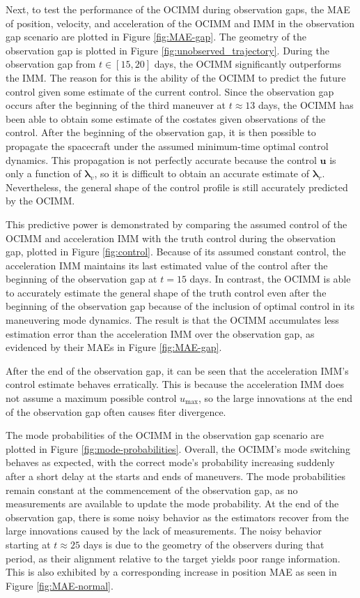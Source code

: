 \documentclass[letterpaper, preprint, paper,11pt]{AAS}	%
\begin{document}
Next, to test the performance of the OCIMM during observation gaps, the MAE of position, velocity, and acceleration of the OCIMM and IMM in the observation gap scenario are plotted in Figure \ref{fig:MAE-gap}. The geometry of the observation gap is plotted in Figure \ref{fig:unobserved_trajectory}. During the observation gap from $t \in [15, 20]$ days, the OCIMM significantly outperforms the IMM. The reason for this is the ability of the OCIMM to predict the future control given some estimate of the current control. Since the observation gap occurs after the beginning of the third maneuver at $t \approx 13$ days, the OCIMM has been able to obtain some estimate of the costates given observations of the control. After the beginning of the observation gap, it is then possible to propagate the spacecraft under the assumed minimum-time optimal control dynamics. This propagation is not perfectly accurate because the control $\bm{u}$ is only a function of $\bm{\lambda}_v$, so it is difficult to obtain an accurate estimate of $\bm{\lambda}_r$. Nevertheless, the general shape of the control profile is still accurately predicted by the OCIMM.

This predictive power is demonstrated by comparing the assumed control of the OCIMM and acceleration IMM with the truth control during the observation gap, plotted in Figure \ref{fig:control}. Because of its assumed constant control, the acceleration IMM maintains its last estimated value of the control after the beginning of the observation gap at $t=15$ days. In contrast, the OCIMM is able to accurately estimate the general shape of the truth control even after the beginning of the observation gap because of the inclusion of optimal control in its maneuvering mode dynamics. The result is that the OCIMM accumulates less estimation error than the acceleration IMM over the observation gap, as evidenced by their MAEs in Figure \ref{fig:MAE-gap}. 

After the end of the observation gap, it can be seen that the acceleration IMM's control estimate behaves erratically. This is because the acceleration IMM does not assume a maximum possible control $u_\text{max}$, so the large innovations at the end of the observation gap often causes fiter divergence.

The mode probabilities of the OCIMM in the observation gap scenario are plotted in Figure \ref{fig:mode-probabilities}. Overall, the OCIMM's mode switching behaves as expected, with the correct mode's probability increasing suddenly after a short delay at the starts and ends of maneuvers. The mode probabilities remain constant at the commencement of the observation gap, as no measurements are available to update the mode probability. At the end of the observation gap, there is some noisy behavior as the estimators recover from the large innovations caused by the lack of measurements. The noisy behavior starting at $t \approx 25$ days is due to the geometry of the observers during that period, as their alignment relative to the target yields poor range information. This is also exhibited by a corresponding increase in position MAE as seen in Figure \ref{fig:MAE-normal}.
\end{document}
